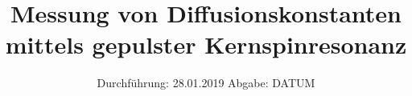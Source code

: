 

\subject{V 49}
\title{Messung von Diffusionskonstanten mittels
gepulster Kernspinresonanz}
\date{
  Durchführung: 28.01.2019
  \hspace{3em}
  Abgabe: DATUM
}



\maketitle
\thispagestyle{empty}
\tableofcontents
\newpage
\setcounter{page}{1}





\printbibliography


